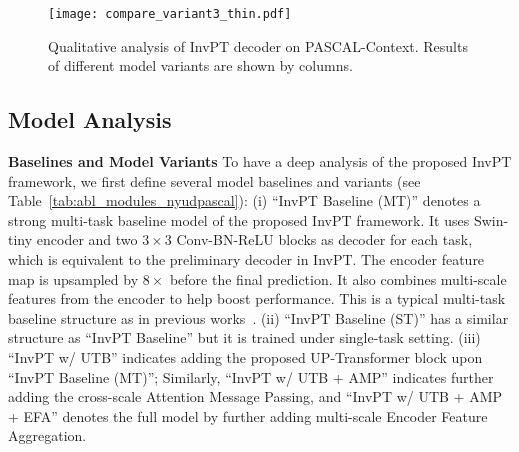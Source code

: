 \documentclass[runningheads]{llncs}
\begin{document}
\begin{figure}[!t]
	\centering
	\texttt{[image: compare\_variant3\_thin.pdf]}
    \vspace{-8pt}
	\caption{Qualitative analysis of InvPT decoder on PASCAL-Context. Results of different model variants are shown by columns.
	}
	\label{fig:qualitative_ablation_2}
\vspace{-18pt}
\end{figure}

\subsection{Model Analysis}
\par\noindent\textbf{Baselines and Model Variants} To have a deep analysis of the proposed InvPT framework, we first define several model baselines and variants (see Table~\ref{tab:abl_modules_nyudpascal}):
(i) {``InvPT Baseline (MT)''} denotes a strong multi-task baseline model of the proposed  InvPT framework. It uses Swin-tiny encoder and two $3\times 3$ Conv-BN-ReLU blocks as decoder for each task, which is equivalent to the preliminary decoder in InvPT. The encoder feature map is upsampled by $8\times$ before the final prediction. It also combines multi-scale features from the encoder to help boost performance. This is a typical multi-task baseline structure as in previous works~\cite{mti,atrc}.
(ii) ``InvPT Baseline (ST)'' has a similar structure as ``InvPT Baseline'' but it is trained under single-task setting. (iii) ``InvPT w/ UTB'' indicates adding the proposed UP-Transformer block upon ``InvPT Baseline (MT)''; Similarly, ``InvPT w/ UTB + AMP'' indicates further adding the cross-scale Attention Message Passing, and ``InvPT w/ UTB + AMP + EFA'' denotes the full model by further adding multi-scale Encoder Feature Aggregation.
\end{document}

